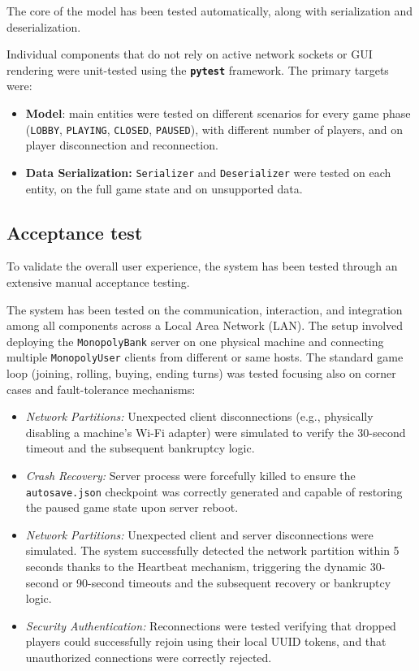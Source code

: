 \documentclass{scrartcl}
\begin{document}
The core of the model has been tested automatically, along with serialization and deserialization.

Individual components that do not rely on active network sockets or GUI rendering were unit-tested using the \textbf{\texttt{pytest}} framework.
The primary targets were:
\begin{itemize}
    \item \textbf{Model}: main entities were tested on different scenarios for every game phase (\texttt{LOBBY}, \texttt{PLAYING}, \texttt{CLOSED}, \texttt{PAUSED}),
                            with different number of players, and on player disconnection and reconnection.
    \item \textbf{Data Serialization:} \texttt{Serializer} and \texttt{Deserializer} were tested on each entity,
                                        on the full game state and on unsupported data.
\end{itemize}

\subsection{Acceptance test}\label{acceptance-test}
To validate the overall user experience, the system has been tested through an extensive manual acceptance testing.

The system has been tested on the communication, interaction, and integration among all components across a Local Area Network (LAN).
The setup involved deploying the \texttt{MonopolyBank} server on one physical machine and connecting multiple \texttt{MonopolyUser} clients from different or same hosts.
The standard game loop (joining, rolling, buying, ending turns) was tested focusing also on corner cases and fault-tolerance mechanisms:
  \begin{itemize}
      \item \textit{Network Partitions:} Unexpected client disconnections (e.g., physically disabling a machine's Wi-Fi adapter) were simulated
                    to verify the 30-second timeout and the subsequent bankruptcy logic.
      \item \textit{Crash Recovery:} Server process were forcefully killed to ensure the \texttt{autosave.json} checkpoint
                    was correctly generated and capable of restoring the paused game state upon server reboot.
      \item \textit{Network Partitions:} Unexpected client and server disconnections were simulated.
                    The system successfully detected the network partition within 5 seconds thanks to the Heartbeat mechanism,
                    triggering the dynamic 30-second or 90-second timeouts and the subsequent recovery or bankruptcy logic.
      \item \textit{Security Authentication:} Reconnections were tested verifying that dropped players could successfully
                    rejoin using their local UUID tokens, and that unauthorized connections were correctly rejected.
  \end{itemize}
\end{document}
